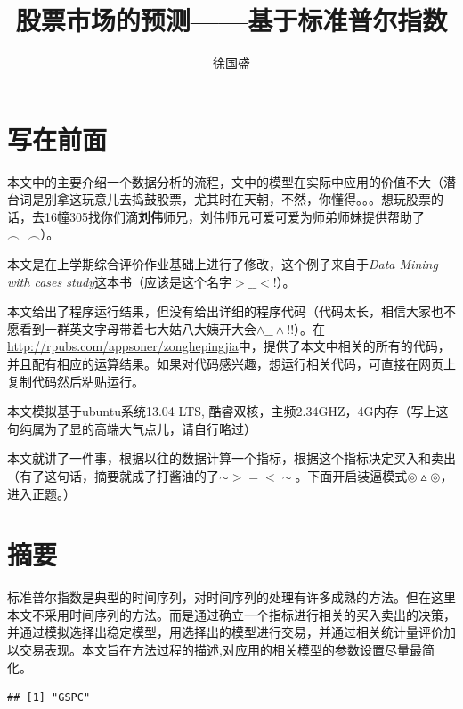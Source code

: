 \documentclass{article}\usepackage[]{graphicx}\usepackage[]{color}
\title{股票市场的预测——基于标准普尔指数}
\author{徐国盛}
\makeatletter
\newenvironment{kframe}{%
 \def\at@end@of@kframe{}%
 \ifinner\ifhmode%
  \def\at@end@of@kframe{\end{minipage}}%
  \begin{minipage}{\columnwidth}%
 \fi\fi%
 \def\FrameCommand##1{\hskip\@totalleftmargin \hskip-\fboxsep
 \colorbox{shadecolor}{##1}\hskip-\fboxsep
     \hskip-\linewidth \hskip-\@totalleftmargin \hskip\columnwidth}%
 \MakeFramed {\advance\hsize-\width
   \@totalleftmargin\z@ \linewidth\hsize
   \@setminipage}}%
 {\par\unskip\endMakeFramed%
 \at@end@of@kframe}
\newenvironment{knitrout}{}{} %
\makeatother
\begin{document}
\begin{CJK*}{UTF8}{gkai}
\maketitle
\tableofcontents
\section{写在前面}

\textbullet 本文中的主要介绍一个数据分析的流程，文中的模型在实际中应用的价值不大（潜台词是别拿这玩意儿去捣鼓股票，尤其时在天朝，不然，你懂得。。。想玩股票的话，去16幢305找你们滴\textbf{刘伟}师兄，刘伟师兄可爱可爱为师弟师妹提供帮助了$\smallfrown\_\_\smallfrown$）。

\textbullet 本文是在上学期综合评价作业基础上进行了修改，这个例子来自于\textit{Data Mining with cases study}这本书（应该是这个名字$>\_\_<$!）。

\textbullet 本文给出了程序运行结果，但没有给出详细的程序代码（代码太长，相信大家也不愿看到一群英文字母带着七大姑八大姨开大会$\wedge\_\_\wedge$!!）。在\url{http://rpubs.com/appsoner/zonghepingjia}中，提供了本文中相关的所有的代码，并且配有相应的运算结果。如果对代码感兴趣，想运行相关代码，可直接在网页上复制代码然后粘贴运行。

\textbullet 本文模拟基于ubuntu系统13.04 LTS, 酷睿双核，主频2.34GHZ，4G内存（写上这句纯属为了显的高端大气点儿，请自行略过）

\textbullet 本文就讲了一件事，根据以往的数据计算一个指标，根据这个指标决定买入和卖出（有了这句话，摘要就成了打酱油的了$\sim>=<\sim$。下面开启装逼模式$\circledcirc\vartriangle\circledcirc$，进入正题。）
\section{摘要}

标准普尔指数是典型的时间序列，对时间序列的处理有许多成熟的方法。但在这里本文不采用时间序列的方法。而是通过确立一个指标进行相关的买入卖出的决策，并通过模拟选择出稳定模型，用选择出的模型进行交易，并通过相关统计量评价加以交易表现。本文旨在方法过程的描述,对应用的相关模型的参数设置尽量最简化。


\begin{knitrout}
\color{fgcolor}\begin{kframe}
\begin{verbatim}
## [1] "GSPC"
\end{verbatim}
\end{kframe}
\end{knitrout}

\end{CJK*}
\end{document}

